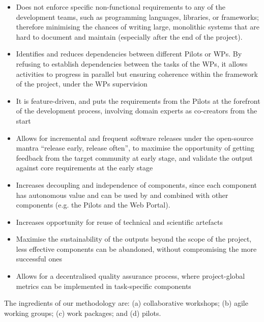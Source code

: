 \begin{itemize}
    \item Does not enforce specific non-functional requirements to any of the development teams, such as programming languages, libraries, or frameworks; therefore minimising the chances of writing large, monolithic systems that are hard to document and maintain (especially after the end of the project). %
    \item Identifies and reduces dependencies between different Pilots or WPs. By refusing to establish dependencies between the tasks of the WPs, it allows activities to progress in parallel but ensuring coherence within the framework of the project, under the WPs supervision
    \item It is feature-driven, and puts the requirements from the Pilots at the forefront of the development process, involving domain experts as co-creators from the start
    \item Allows for incremental and frequent software releases under the open-source mantra ``release early, release often'', to maximise the opportunity of getting feedback from the target community at early stage, and validate the output against core requirements at the early stage
    \item Increases decoupling and independence of components, since each component has autonomous value and can be used by and combined with other components (e.g. the Pilots and the Web Portal). 
    \item Increases opportunity for reuse of technical and scientific artefacts
    \item Maximise the sustainability of the outputs beyond the scope of the project, less effective components can be abandoned, without compromising the more successful ones
    \item Allows for a decentralised quality assurance process, where project-global metrics can be implemented in task-specific components
\end{itemize}


The ingredients of our methodology are: (a) collaborative workshops; (b) agile working groups; (c) work packages; and (d) pilots.


